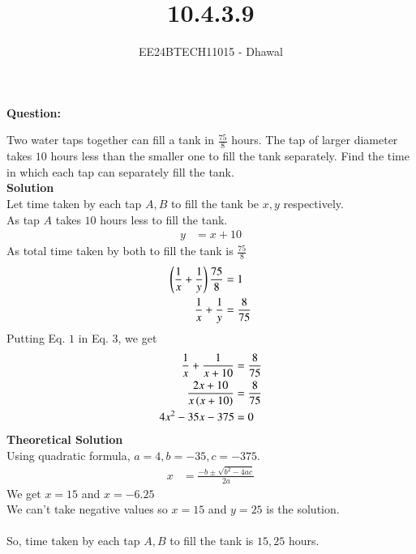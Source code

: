\documentclass[journal]{IEEEtran}
\begin{document}

\vspace{3cm}

\title{10.4.3.9}
\author{EE24BTECH11015 - Dhawal}

{\let\newpage\relax\maketitle}

\renewcommand{\thefigure}{\theenumi}
\renewcommand{\thetable}{\theenumi}
\setlength{\intextsep}{10pt} %

\textbf{Question:}

Two water taps together can fill a tank in $\frac{75}{8}$
hours. The tap of larger diameter takes $10$
hours less than the smaller one to fill the tank separately. Find the time in which each tap can separately fill the tank.\\

\textbf{Solution}\\
Let time taken by each tap $A,B$ to fill the tank be $x,y$ respectively.\\
As tap $A$ takes $10$ hours less to fill the tank.
\begin{align}
    y&=x+10
\end{align}
As total time taken by both to fill the tank is $\frac{75}{8}$
\begin{align}
    \left(\frac{1}{x}+\frac{1}{y}\right)\frac{75}{8}&=1\\
    \frac{1}{x}+\frac{1}{y}&=\frac{8}{75}
\end{align}
Putting Eq. $1$ in Eq. $3$, we get
\begin{align}
    \frac{1}{x}+\frac{1}{x+10}&=\frac{8}{75}\\
    \frac{2x+10}{x\left(x+10\right)}&=\frac{8}{75}\\
    4x^2-35x-375&=0
\end{align}
\textbf{Theoretical Solution}\\
Using quadratic formula, $a=4, b=-35, c=-375$.\\
\begin{align}
    x&=\frac{-b\pm\sqrt{b^2-4ac}}{2a}
\end{align}
We get $x=15$ and $x=-6.25$\\
We can't take negative values so $x=15$ and $y=25$ is the solution.\\\\
So, time taken by each tap $A,B$ to fill the tank is $15,25$ hours.\\
\end{document}
